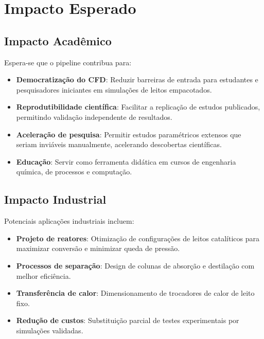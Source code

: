 \section{Impacto Esperado}

\subsection{Impacto Acadêmico}

Espera-se que o pipeline contribua para:

\begin{itemize}
    \item \textbf{Democratização do CFD}: Reduzir barreiras de entrada para estudantes e pesquisadores iniciantes em simulações de leitos empacotados.
    
    \item \textbf{Reprodutibilidade científica}: Facilitar a replicação de estudos publicados, permitindo validação independente de resultados.
    
    \item \textbf{Aceleração de pesquisa}: Permitir estudos paramétricos extensos que seriam inviáveis manualmente, acelerando descobertas científicas.
    
    \item \textbf{Educação}: Servir como ferramenta didática em cursos de engenharia química, de processos e computação.
\end{itemize}

\subsection{Impacto Industrial}

Potenciais aplicações industriais incluem:

\begin{itemize}
    \item \textbf{Projeto de reatores}: Otimização de configurações de leitos catalíticos para maximizar conversão e minimizar queda de pressão.
    
    \item \textbf{Processos de separação}: Design de colunas de absorção e destilação com melhor eficiência.
    
    \item \textbf{Transferência de calor}: Dimensionamento de trocadores de calor de leito fixo.
    
    \item \textbf{Redução de custos}: Substituição parcial de testes experimentais por simulações validadas.
\end{itemize}

